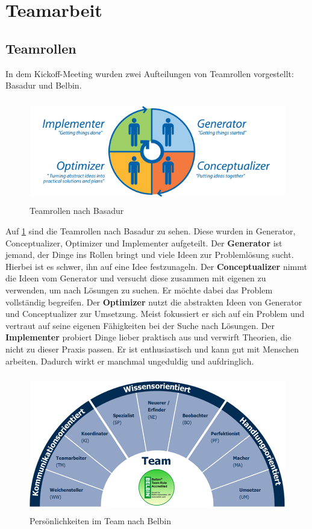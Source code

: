 \documentclass[a4paper,12pt,headsepline]{scrartcl}
\begin{document}
	\newpage
	\section{Teamarbeit}
	
	\subsection{Teamrollen}
		In dem Kickoff-Meeting wurden zwei Aufteilungen von Teamrollen vorgestellt: Basadur und Belbin.
		\begin{figure} [H]
			\centering
			\includegraphics[height=4.5cm]{Images/Basadur.png}
			\caption{Teamrollen nach Basadur}
			\label{fig:Basadur}
		\end{figure}
		Auf \cref{fig:Basadur} sind die Teamrollen nach Basadur zu sehen. Diese wurden in Generator, Conceptualizer, Optimizer und Implementer aufgeteilt. Der \textbf{Generator} ist jemand, der Dinge ins Rollen bringt und viele Ideen zur Problemlösung sucht. Hierbei ist es schwer, ihn auf eine Idee festzunageln. Der \textbf{Conceptualizer} nimmt die Ideen vom Generator und versucht diese zusammen mit eigenen zu verwenden, um nach Lösungen zu suchen. Er möchte dabei das Problem vollständig begreifen. Der \textbf{Optimizer} nutzt die abstrakten Ideen von Generator und Conceptualizer zur Umsetzung. Meist fokussiert er sich auf ein Problem und vertraut auf seine eigenen Fähigkeiten bei der Suche nach Lösungen. Der \textbf{Implementer} probiert Dinge lieber praktisch aus und verwirft Theorien, die nicht zu dieser Praxis passen. Er ist enthusiastisch und kann gut mit Menschen arbeiten. Dadurch wirkt er manchmal ungeduldig und aufdringlich.\
		\begin{figure} [H]
			\centering
			\includegraphics[height=6cm, width=12cm]{Images/Belbin.png}
			\caption{Persönlichkeiten im Team nach Belbin}
			\label{fig:Belbin}
		\end{figure}
\end{document}

